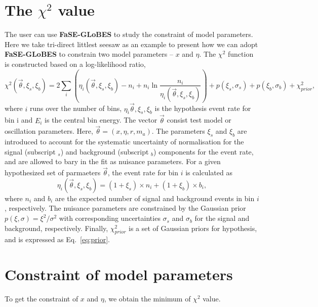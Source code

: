 \documentclass[aps,prd,nofootinbib,preprint]{revtex4}
\begin{document}
\section{The $\chi^2$ value}

The user can use \textbf{FaSE-GLoBES} to study the constraint of model parameters. Here we take tri-direct littlest seesaw as an example to present how we can adopt \textbf{FaSE-GLoBES} to constrain two model parameters -- $x$ and $\eta$. 
The $\chi^2$ function is constructed based on a log-likelihood ratio,
\begin{equation}\label{eq:chi-squared}
\chi^2(\vec{\theta},\xi_s,\xi_b)=2\sum_i\left(\eta_i(\vec{\theta},\xi_s,\xi_b)-n_i+n_i\ln\frac{n_i}{\eta_i(\vec{\theta},\xi_s,\xi_b)} \right)+p(\xi_s,\sigma_s)+p(\xi_b,\sigma_b)+\chi^2_{prior},
\end{equation}
where $i$ runs over the number of bins, $\eta_i{\vec{\theta},\xi_s,\xi_b}$ is the hypothesis event rate for bin i and $E_i$ is the central bin energy. The vector $\vec{\theta}$ consist test model or oscillation parameters. Here, $\vec{\theta}=(x,\eta,r,m_a)$. The parameters $\xi_s$ and $\xi_b$ are introduced to account for the systematic uncertainty of normalisation for the signal (subscript $_s$) and background (subscript $_b$) components for the event rate, and are allowed to bary in the fit as nuisance parameters. For a given hypothesized set of parmaeters $\vec{\theta}$, the event rate for bin $i$ is calculated as\\
\begin{equation}
\eta_i(\vec{\theta},\xi_s,\xi_b)=(1+\xi_s)\times n_i+(1+\xi_b)\times b_i,
\end{equation}
where $n_i$ and $b_i$ are the expected number of signal and background events in bin $i$, respectively. The nuisance parameters are constrained by the Gaussian prior $p(\xi,\sigma)=\xi^2/\sigma^2$ with corresponding uncertainties $\sigma_s$ and $\sigma_b$ for the signal and background, respectively. Finally, $\chi^2_{prior}$ is a set of Gaussian priors for hypothesis, and is expressed as Eq.~\ref{eq:prior}. 


\section{Constraint of model parameters}

To get the constraint of $x$ and $\eta$, we obtain the minimum of $\chi^2$ value.\\
\end{document}

